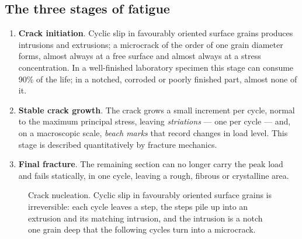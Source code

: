 \documentclass[11pt,a4paper]{article}
\begin{document}
\subsection{The three stages of fatigue}
\begin{enumerate}[nosep]
  \item \textbf{Crack initiation}. Cyclic slip in favourably oriented surface grains produces intrusions and extrusions; a microcrack of the order of one grain diameter forms, almost always at a free surface and almost always at a stress concentration. In a well-finished laboratory specimen this stage can consume 90\% of the life; in a notched, corroded or poorly finished part, almost none of it.
  \item \textbf{Stable crack growth}. The crack grows a small increment per cycle, normal to the maximum principal stress, leaving \emph{striations} --- one per cycle --- and, on a macroscopic scale, \emph{beach marks} that record changes in load level. This stage is described quantitatively by fracture mechanics.
  \item \textbf{Final fracture}. The remaining section can no longer carry the peak load and fails statically, in one cycle, leaving a rough, fibrous or crystalline area.
\end{enumerate}
\begin{figure}[H]\centering


\caption{Crack nucleation. Cyclic slip in favourably oriented surface grains is irreversible: each cycle leaves a step, the steps pile up into an extrusion and its matching intrusion, and the intrusion is a notch one grain deep that the following cycles turn into a microcrack.}
\label{fig:slip}
\end{figure}
\end{document}
